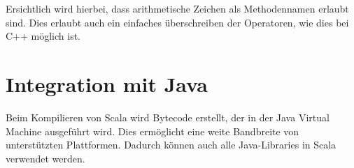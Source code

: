 Ersichtlich wird hierbei, dass arithmetische Zeichen
als Methodennamen erlaubt sind. Dies erlaubt auch ein einfaches überschreiben
der Operatoren, wie dies bei C++ möglich ist.

\section{Integration mit Java}

Beim Kompilieren von Scala wird Bytecode erstellt, der in der Java
Virtual Machine ausgeführt wird. Dies ermöglicht eine weite Bandbreite
von unterstützten Plattformen. Dadurch können auch alle Java-Libraries
in Scala verwendet werden. \\
